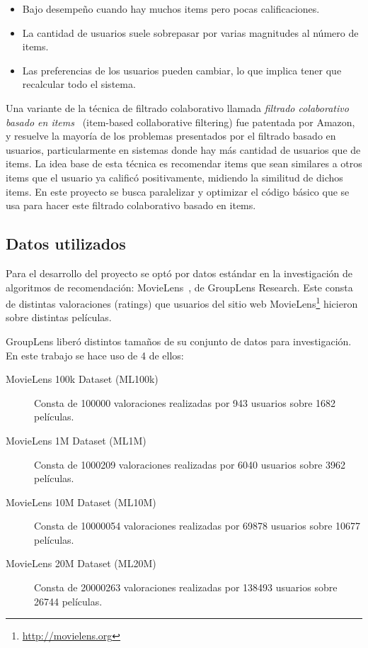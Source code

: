 \documentclass[11pt, a4paper]{article}
\begin{document}
  \begin{itemize}
    \item Bajo desempeño cuando hay muchos items pero pocas calificaciones.
    \item La cantidad de usuarios suele sobrepasar por varias magnitudes al
        número de items.
    \item Las preferencias de los usuarios pueden cambiar, lo que implica tener
        que recalcular todo el sistema.
  \end{itemize}

  Una variante de la técnica de filtrado colaborativo llamada {\em filtrado
  colaborativo basado en items}~\cite{linden2001collaborative} (item-based
  collaborative filtering) fue patentada por Amazon, y resuelve la mayoría de
  los problemas presentados por el filtrado basado en usuarios, particularmente
  en sistemas donde hay más cantidad de usuarios que de items. La idea base de
  esta técnica es recomendar items que sean similares a otros items que el
  usuario ya calificó positivamente, midiendo la similitud de dichos items. En
  este proyecto se busca paralelizar y optimizar el código básico que se usa
  para hacer este filtrado colaborativo basado en items.

  \subsection{Datos utilizados}\label{sec:datos}

  Para el desarrollo del proyecto se optó por datos estándar en la
  investigación de algoritmos de recomendación:
  MovieLens~\cite{Harper:2015:MDH:2866565.2827872}, de GroupLens Research. Este
  consta de distintas valoraciones (ratings) que usuarios del sitio web
  MovieLens\footnote{\url{http://movielens.org}} hicieron sobre distintas
  películas.

  GroupLens liberó distintos tamaños de su conjunto de datos para
  investigación. En este trabajo se hace uso de 4 de ellos:

  \begin{description} 
      \item[MovieLens 100k Dataset (ML100k)] Consta de 100000 valoraciones
          realizadas por 943 usuarios sobre 1682 películas.
      \item[MovieLens 1M Dataset (ML1M)] Consta de 1000209 valoraciones
          realizadas por 6040 usuarios sobre 3962 películas.
      \item[MovieLens 10M Dataset (ML10M)] Consta de 10000054 valoraciones
          realizadas por 69878 usuarios sobre 10677 películas.
      \item[MovieLens 20M Dataset (ML20M)] Consta de 20000263 valoraciones
          realizadas por 138493 usuarios sobre 26744 películas.
  \end{description}
\end{document}
